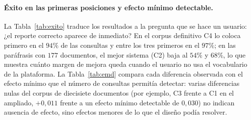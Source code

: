 \documentclass[11pt,letterpaper]{article}
\numberwithin{equation}{section}
\begin{document}
\paragraph{Éxito en las primeras posiciones y efecto mínimo detectable.} La Tabla~\ref{tab:exito} traduce los resultados a la pregunta que se hace un usuario: ¿el reporte correcto aparece de inmediato? En el corpus definitivo C4 lo coloca primero en el $94\%$ de las consultas y entre los tres primeros en el $97\%$; en las paráfrasis con $177$ documentos, el mejor sistema (C2) baja al $54\%$ y $68\%$, lo que muestra cuánto margen de mejora queda cuando el usuario no usa el vocabulario de la plataforma. La Tabla~\ref{tab:emd} compara cada diferencia observada con el efecto mínimo que el número de consultas permitía detectar: varias diferencias nulas del corpus de diecisiete documentos (por ejemplo, C3 frente a C1 en el ampliado, $+0{,}011$ frente a un efecto mínimo detectable de $0{,}030$) no indican ausencia de efecto, sino efectos menores de lo que el diseño podía resolver.
\end{document}
